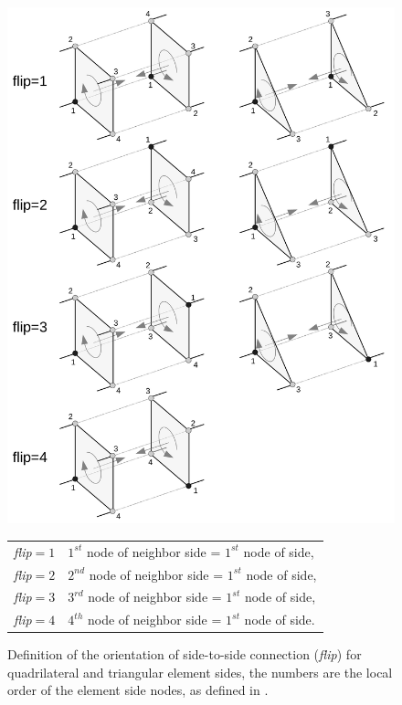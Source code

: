 \documentclass[a4paper,headsepline]{scrreprt}
\newcommand\rf[1]{\prettyref{#1}}
\begin{document}
\begin{figure}[h!]
\centering
\includegraphics[height=0.66\textheight]{pics/flip.pdf} \\
\begin{tabular}{ll}
\emph{flip}$=1$ & $1^{st}$ node of neighbor side = $1^{st}$ node of side, \\
\emph{flip}$=2$ & $2^{nd}$ node of neighbor side = $1^{st}$ node of side, \\
\emph{flip}$=3$ & $3^{rd}$ node of neighbor side = $1^{st}$ node of side, \\
\emph{flip}$=4$ & $4^{th}$ node of neighbor side = $1^{st}$ node of side. \\
\end{tabular}

\caption{Definition of the orientation of side-to-side connection (\emph{flip}) for quadrilateral and triangular element sides, the numbers are the local order of the element side nodes, as defined in \rf{sec:CGNS}. }
\label{fig:flip}
\end{figure}
\end{document}
